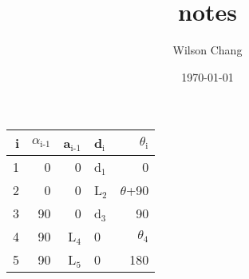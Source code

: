 \documentclass[11pt]{article}
\author{Wilson Chang}
\date{\today}
\title{notes}
\begin{document}
\maketitle
\tableofcontents

\begin{center}
\begin{tabular}{rrrlr}
i & $\alpha$$_{\text{i-1}}$ & a$_{\text{i-1}}$ & d$_{\text{i}}$ & $\theta$$_{\text{i}}$\\
\hline
1 & 0 & 0 & d$_{\text{1}}$ & 0\\
2 & 0 & 0 & L$_{\text{2}}$ & $\theta$+90\\
3 & 90 & 0 & d$_{\text{3}}$ & 90\\
4 & 90 & L$_{\text{4}}$ & 0 & $\theta$$_{\text{4}}$\\
5 & 90 & L$_{\text{5}}$ & 0 & 180\\
\end{tabular}
\end{center}
\end{document}
